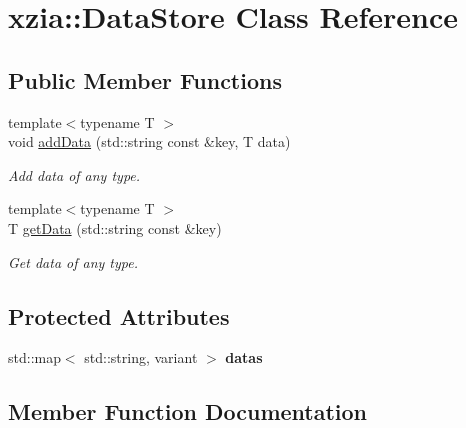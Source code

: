 \hypertarget{classxzia_1_1DataStore}{}\section{xzia\+:\+:Data\+Store Class Reference}
\label{classxzia_1_1DataStore}
\subsection*{Public Member Functions}
\begin{DoxyCompactItemize}
\item 
{\footnotesize template$<$typename T $>$ }\\void \mbox{\hyperlink{classxzia_1_1DataStore_a6b33f3014ff94d124fcc3065c5884a6d}{add\+Data}} (std\+::string const \&key, T data)
\begin{DoxyCompactList}\small\item\em Add data of any type. \end{DoxyCompactList}\item 
{\footnotesize template$<$typename T $>$ }\\T \mbox{\hyperlink{classxzia_1_1DataStore_a6a25b0f50250ac2793a0ed7abcabb147}{get\+Data}} (std\+::string const \&key)
\begin{DoxyCompactList}\small\item\em Get data of any type. \end{DoxyCompactList}\end{DoxyCompactItemize}
\subsection*{Protected Attributes}
\begin{DoxyCompactItemize}
\item 
\mbox{\label{classxzia_1_1DataStore_a3bbea48eb0a1432158a016315c3d1557}} 
std\+::map$<$ std\+::string, variant $>$ {\bfseries datas}
\end{DoxyCompactItemize}


\subsection{Member Function Documentation}
\mbox{\label{classxzia_1_1DataStore_a6b33f3014ff94d124fcc3065c5884a6d}} 
